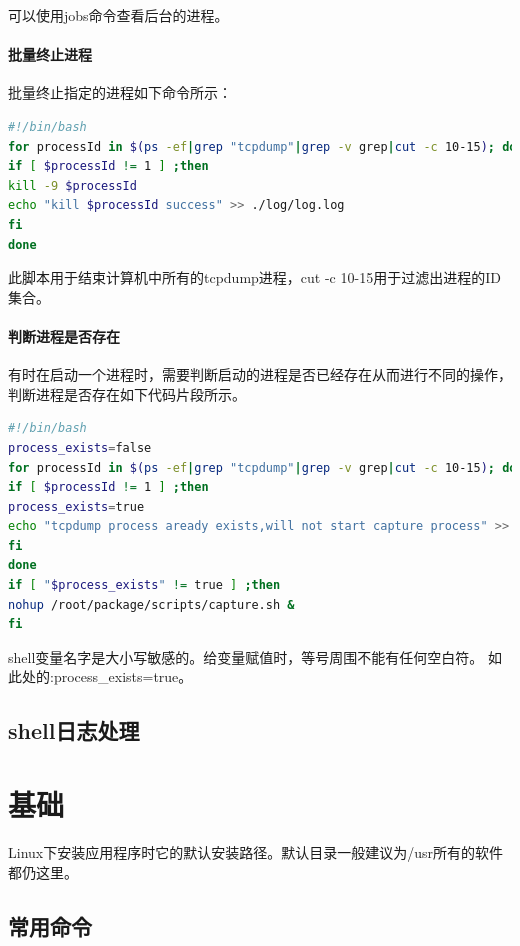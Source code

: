 \documentclass{book}
\begin{document}
可以使用jobs命令查看后台的进程。

\paragraph{批量终止进程}批量终止指定的进程如下命令所示：

\begin{lstlisting}[language=Bash]
#!/bin/bash
for processId in $(ps -ef|grep "tcpdump"|grep -v grep|cut -c 10-15); do	
if [ $processId != 1 ] ;then
kill -9 $processId
echo "kill $processId success" >> ./log/log.log
fi
done
\end{lstlisting}

此脚本用于结束计算机中所有的tcpdump进程，cut -c 10-15用于过滤出进程的ID集合。

\paragraph{判断进程是否存在}

有时在启动一个进程时，需要判断启动的进程是否已经存在从而进行不同的操作，
判断进程是否存在如下代码片段所示。

\begin{lstlisting}[language=Bash]
#!/bin/bash
process_exists=false
for processId in $(ps -ef|grep "tcpdump"|grep -v grep|cut -c 10-15); do
if [ $processId != 1 ] ;then
process_exists=true
echo "tcpdump process aready exists,will not start capture process" >> ./log/capture.log
fi
done
if [ "$process_exists" != true ] ;then
nohup /root/package/scripts/capture.sh &
fi
\end{lstlisting}

shell变量名字是大小写敏感的。给变量赋值时，等号周围不能有任何空白符。
如此处的:process\_exists=true。

\subsection{shell日志处理}



\section{基础}

Linux下安装应用程序时它的默认安装路径。默认目录一般建议为/usr所有的软件都仍这里。

\subsection{常用命令}
\end{document}
